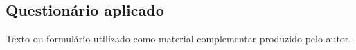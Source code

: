 \begin{apendicesenv}
\chapter{Questionário aplicado}
Texto ou formulário utilizado como material complementar produzido pelo autor.
\end{apendicesenv}

